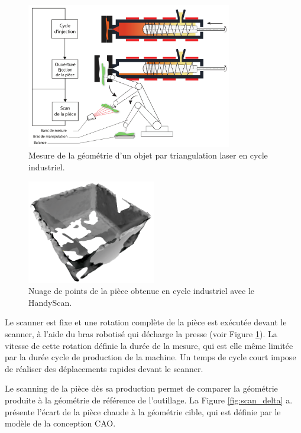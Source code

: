 \begin{figure}[bhtp]
	\centering
	\includegraphics[width=0.8\textwidth]{../Chap2/Figures/online_scan.pdf}
	\caption{Mesure de la géométrie d'un objet par triangulation laser en cycle industriel.}
	\label{fig:online_scan}
\end{figure}

\begin{figure}[thbp]
	\centering
	\includegraphics[width=0.5\textwidth]{../Chap2/Figures/online_3d_scan.png}
	\caption{Nuage de points de la pièce obtenue en cycle industriel avec le HandyScan.}
	\label{fig:online_scan_result}
\end{figure}

Le scanner est fixe et une rotation complète de la pièce est exécutée devant le scanner, à l'aide du bras robotisé qui décharge la presse (voir Figure \ref{fig:online_scan}).
La vitesse de cette rotation définie la durée de la mesure, qui est elle même limitée par la durée cycle de production de la machine.
Un temps de cycle court impose de réaliser des déplacements rapides devant le scanner.

Le scanning de la pièce dès sa production permet de comparer la géométrie produite à la géométrie de référence de l'outillage.
La Figure \ref{fig:scan_delta} a. présente l'écart de la pièce chaude à la géométrie cible, qui est définie par le modèle de la conception CAO.

